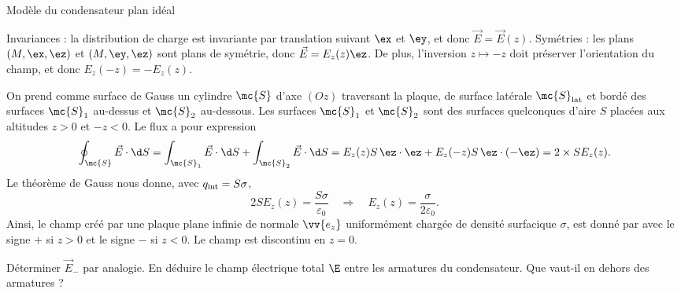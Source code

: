 \begin{exo}[PC][1][TD]{Modèle du condensateur plan idéal}
\begin{quest}
{  Invariances : la distribution de charge est invariante par translation suivant $\ex$ et $\ey$, et donc $\Vec{E}= \Vec{E}(z)$. Symétries : les plans $(M,\ex,\ez)$ et  $(M,\ey,\ez)$ sont plans de symétrie, donc $\Vec{E} = E_z(z) \ez$. De plus, l’inversion $z \mapsto -z$ doit préserver l’orientation du champ, et donc $E_z(-z)=-E_z(z)$.

  On prend comme surface de Gauss un cylindre $\mc{S}$ d’axe $(Oz)$ traversant la plaque, de surface latérale $\mc{S}_{\rm lat}$ et bordé des surfaces $\mc{S}_1$ au-dessus et $\mc{S}_2$ au-dessous. Les surfaces $\mc{S}_1$ et $\mc{S}_2$ sont des surfaces quelconques d’aire $S$ placées aux altitudes $z>0$ et $-z<0$. Le flux a pour expression
  \begin{equation}
  \oint_\mc{S} \Vec{E} \cdot \d S = \int_{\mc{S}_1} \Vec{E} \cdot \d S + \int_{\mc{S}_2} \Vec{E} \cdot \d S = E_z(z) S\, \ez \cdot \ez + E_z(-z) S\, \ez \cdot (-\ez)  = 2\times S E_z(z).
  \end{equation}
  Le théorème de Gauss nous donne, avec $q_{\rm int} = S \sigma$,
  \begin{equation}
  2 S E_z(z) = \frac{S \sigma}{\varepsilon_0}\quad \Rightarrow \quad E_z(z) = \frac{\sigma}{2\varepsilon_0}.
  \end{equation}
  Ainsi, le champ créé par une plaque plane infinie de normale $\vv{e_z}$ uniformément chargée de densité surfacique $\sigma$, est donné par
  avec le signe $+$ si $z>0$ et le signe $-$ si $z<0$. Le champ est discontinu en $z=0$.
}

\item Déterminer $\Vec{E}_-$ par analogie. En déduire le champ électrique total $\E$ entre les armatures du condensateur. Que vaut-il en dehors des armatures ?


\end{quest}
\end{exo}
